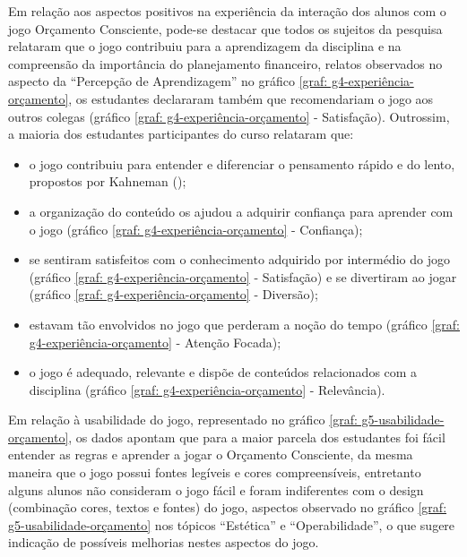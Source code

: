 Em relação aos aspectos positivos na experiência da interação dos alunos com o jogo Orçamento Consciente, pode-se destacar que todos os sujeitos da pesquisa relataram que o jogo contribuiu para a aprendizagem da disciplina e na compreensão da importância do planejamento financeiro, relatos observados no aspecto da “Percepção de Aprendizagem” no gráfico \ref{graf: g4-experiência-orçamento}, os estudantes declararam também que recomendariam o jogo aos outros colegas (gráfico \ref{graf: g4-experiência-orçamento} - Satisfação). Outrossim, a maioria dos estudantes participantes do curso relataram que:

\begin{itemize}
    \item o jogo contribuiu para entender e diferenciar o pensamento rápido e do lento, propostos por Kahneman (\citeyear{kahneman2012});

    \item a organização do conteúdo os ajudou a adquirir confiança para aprender com o jogo (gráfico \ref{graf: g4-experiência-orçamento} - Confiança);

    \item se sentiram satisfeitos com o conhecimento adquirido por intermédio do jogo (gráfico \ref{graf: g4-experiência-orçamento} - Satisfação) e se divertiram ao jogar (gráfico \ref{graf: g4-experiência-orçamento} - Diversão);

    \item estavam tão envolvidos no jogo que perderam a noção do tempo (gráfico \ref{graf: g4-experiência-orçamento} - Atenção Focada);

    \item o jogo é adequado, relevante e dispõe de conteúdos relacionados com a disciplina (gráfico \ref{graf: g4-experiência-orçamento} - Relevância).
\end{itemize}

Em relação à usabilidade do jogo, representado no gráfico \ref{graf: g5-usabilidade-orçamento}, os dados apontam que para a maior parcela dos estudantes foi fácil entender as regras e aprender a jogar o Orçamento Consciente, da mesma maneira que o jogo possui fontes legíveis e cores compreensíveis, entretanto alguns alunos não consideram o jogo fácil e foram indiferentes com o design (combinação cores, textos e fontes) do jogo, aspectos observado no gráfico \ref{graf: g5-usabilidade-orçamento} nos tópicos “Estética” e “Operabilidade”, o que sugere indicação de possíveis melhorias nestes aspectos do jogo.

